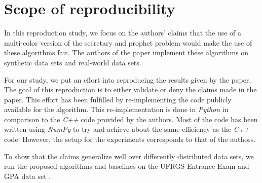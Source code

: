 \section{Scope of reproducibility}
\label{sec:claims}
In this reproduction study, we focus on the authors' claims that the use of a multi-color version of the secretary and prophet problem would make the use of these algorithms fair. The authors of the paper implement these algorithms on synthetic data sets and real-world data sets.

For our study, we put an effort into reproducing the results given by the paper. The goal of this reproduction is to either validate or deny the claims made in the paper. This effort has been fulfilled by re-implementing the code publicly available for the algorithm. This re-implementation is done in \textit{Python} in comparison to the \textit{C++} code provided by the authors. Most of the code has been written using \textit{NumPy} to try and achieve about the same efficiency as the \textit{C++} code. However, the setup for the experiments corresponds to that of the authors.

To show that the claims generalize well over differently distributed data sets, we run the proposed algorithms and baselines on the UFRGS Entrance Exam and GPA data set \citep{DVN/O35FW8_2019}.




